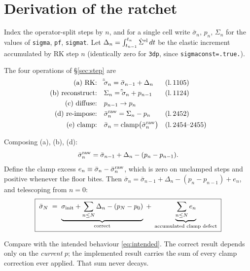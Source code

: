 \documentclass[11pt]{article}
\newcommand{\code}[1]{\texttt{#1}}
\newcommand{\sigeff}{\bar{\sigma}}
\newcommand{\sigtot}{\Sigma}
\begin{document}
\section{Derivation of the ratchet}
\label{sec:derivation}

Index the operator-split steps by $n$, and for a single cell write
$\sigeff_n$, $p_n$, $\sigtot_n$ for the values of \code{sigma}, \code{pf},
\code{sigmat}. Let $\Delta_n = \int_{t_{n-1}}^{t_n}\dot\sigtot^{\rm el}\,dt$
be the elastic increment accumulated by RK step $n$ (identically zero for
\code{3dp}, since \code{sigmaconst=.true.}).

The four operations of \S\ref{sec:step} are
\begin{align}
  \text{(a) RK:}          &\quad \tilde\sigeff_n = \sigeff_{n-1} + \Delta_n
    &&\text{(l.\,1105)} \\
  \text{(b) reconstruct:} &\quad \sigtot_n = \tilde\sigeff_n + p_{n-1}
    &&\text{(l.\,1124)} \\
  \text{(c) diffuse:}     &\quad p_{n-1} \to p_n && \\
  \text{(d) re-impose:}   &\quad \sigeff^{\rm raw}_n = \sigtot_n - p_n
    &&\text{(l.\,2452)} \\
  \text{(e) clamp:}       &\quad \sigeff_n = \mathrm{clamp}\big(\sigeff^{\rm raw}_n\big)
    &&\text{(l.\,2454--2455)}
\end{align}

Composing (a), (b), (d):
\begin{equation}
  \sigeff^{\rm raw}_n = \sigeff_{n-1} + \Delta_n - (p_n - p_{n-1}).
\end{equation}
Define the clamp excess $e_n \equiv \sigeff_n - \sigeff^{\rm raw}_n$, which is
zero on unclamped steps and positive whenever the floor bites. Then
$\sigeff_n = \sigeff_{n-1} + \Delta_n - (p_n - p_{n-1}) + e_n$, and
telescoping from $n=0$:
\begin{equation}
  \boxed{\;
  \sigeff_N \;=\;
  \underbrace{\sigma_{\rm init} + \sum_{n\le N}\Delta_n - (p_N - p_0)}_{\text{correct}}
  \;+\;
  \underbrace{\sum_{n\le N} e_n}_{\text{accumulated clamp defect}} \; }
  \label{eq:telescope}
\end{equation}

Compare with the intended behaviour \eqref{eq:intended}. The correct result
depends only on the \emph{current} $p$; the implemented result carries the
sum of every clamp correction ever applied. That sum never decays.
\end{document}
